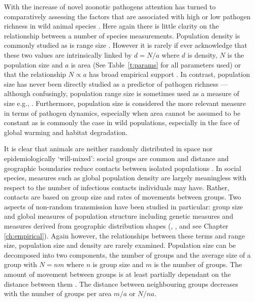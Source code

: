 With the increase of novel zoonotic pathogens \cite{jones2008global} attention has turned to comparatively assessing the factors that are associated with high or low pathogen richness in wild animal species \cite{poulin2000diversity}.
Here again there is little clarity on the relationship between a number of species measurements.
Population density is commonly studied \cite{morand1998density, kamiya2014determines, lindenfors2007parasite, nunn2003comparative, arneberg2002host} as is range size \cite{lindenfors2007parasite, nunn2003comparative, turmelle2009correlates, huang2015parasite, kamiya2014determines}.
However it is rarely if ever acknowledge that these two values are intrinsically linked by $d = N/a$ where $d$ is density, $N$ is the population size and $a$ is area (See Table~\ref{t:params} for all parameters used) or that the relationship $N \propto a$ has broad empirical support \cite{blackburn2006variations, borregaard2010causality}.
In contrast, population size has never been directly studied as a predictor of pathogen richness --- although confusingly, population range size is sometimes used as a measure of size e.g., \cite{vogeli2011island}.
Furthermore, population size is considered the more relevant measure in terms of pathogen dynamics, especially when area cannot be assumed to be constant \cite{begon2002clarification} as is commonly the case in wild populations, especially in the face of global warming and habitat degradation.

It is clear that animals are neither randomly distributed in space nor epidemiologically `will-mixed': social groups are common \cite{kerth2008causes} and distance and geographic boundaries reduce contacts between isolated populations \cite{jenkins2010meta, peel2012henipavirus}.
In social species, measures such as global population density are largely meaningless with respect to the number of infectious contacts individuals may have.
Rather, contacts are based on group size and rates of movements between groups.
Two aspects of non-random transmission have been studied in particular: group size \cite{vitone2004body, gay2014parasite, ezenwa2006host, rifkin2012animals, nunn2003comparative} and global measures of population structure including genetic measures and measures derived from geographic distribution shapes (\textcite{gay2014parasite}, \textcite{maganga2014bat}, \textcite{turmelle2009correlates} and see Chapter \ref{ch:empirical}).
Again however, the relationships between these terms and range size, population size and density are rarely examined.
Population size can be decomposed into two components, the number of groups and the average size of a group with $N = nm$ where $n$ is group size and $m$ is the number of groups.
The amount of movement between groups is at least partially dependant on the distance between them \cite{jenkins2010meta, le2012patterns, schooley2009enhancing}.
The distance between neighbouring groups decreases with the number of groups per area $m/a$ or $N/na$.

